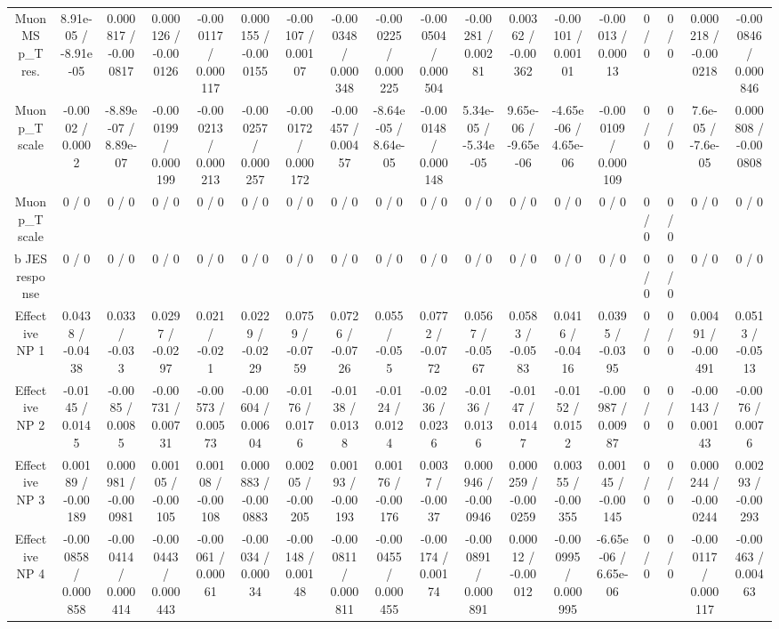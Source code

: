 \documentclass[10pt]{article}
\begin{document}
\begin{table}[htbp]
\begin{center}
\begin{tabular}{|c|c|c|c|c|c|c|c|c|c|c|c|c|c|c|c|c|c|}
  Muon MS p_{T} res. & 8.91e-05 / -8.91e-05 & 0.000817 / -0.000817 & 0.000126 / -0.000126 & -0.000117 / 0.000117 & 0.000155 / -0.000155 & -0.00107 / 0.00107 & -0.000348 / 0.000348 & -0.000225 / 0.000225 & -0.000504 / 0.000504 & -0.00281 / 0.00281 & 0.00362 / -0.00362 & -0.00101 / 0.00101 & -0.00013 / 0.00013 & 0 / 0 & 0 / 0 & 0.000218 / -0.000218 & -0.000846 / 0.000846 \\ 
  Muon p_{T} scale & -0.0002 / 0.0002 & -8.89e-07 / 8.89e-07 & -0.000199 / 0.000199 & -0.000213 / 0.000213 & -0.000257 / 0.000257 & -0.000172 / 0.000172 & -0.00457 / 0.00457 & -8.64e-05 / 8.64e-05 & -0.000148 / 0.000148 & 5.34e-05 / -5.34e-05 & 9.65e-06 / -9.65e-06 & -4.65e-06 / 4.65e-06 & -0.000109 / 0.000109 & 0 / 0 & 0 / 0 & 7.6e-05 / -7.6e-05 & 0.000808 / -0.000808 \\ 
  Muon p_{T} scale & 0 / 0 & 0 / 0 & 0 / 0 & 0 / 0 & 0 / 0 & 0 / 0 & 0 / 0 & 0 / 0 & 0 / 0 & 0 / 0 & 0 / 0 & 0 / 0 & 0 / 0 & 0 / 0 & 0 / 0 & 0 / 0 & 0 / 0 \\ 
  b JES response & 0 / 0 & 0 / 0 & 0 / 0 & 0 / 0 & 0 / 0 & 0 / 0 & 0 / 0 & 0 / 0 & 0 / 0 & 0 / 0 & 0 / 0 & 0 / 0 & 0 / 0 & 0 / 0 & 0 / 0 & 0 / 0 & 0 / 0 \\ 
  Effective NP 1 & 0.0438 / -0.0438 & 0.033 / -0.033 & 0.0297 / -0.0297 & 0.021 / -0.021 & 0.0229 / -0.0229 & 0.0759 / -0.0759 & 0.0726 / -0.0726 & 0.055 / -0.055 & 0.0772 / -0.0772 & 0.0567 / -0.0567 & 0.0583 / -0.0583 & 0.0416 / -0.0416 & 0.0395 / -0.0395 & 0 / 0 & 0 / 0 & 0.00491 / -0.00491 & 0.0513 / -0.0513 \\ 
  Effective NP 2 & -0.0145 / 0.0145 & -0.0085 / 0.0085 & -0.00731 / 0.00731 & -0.00573 / 0.00573 & -0.00604 / 0.00604 & -0.0176 / 0.0176 & -0.0138 / 0.0138 & -0.0124 / 0.0124 & -0.0236 / 0.0236 & -0.0136 / 0.0136 & -0.0147 / 0.0147 & -0.0152 / 0.0152 & -0.00987 / 0.00987 & 0 / 0 & 0 / 0 & -0.00143 / 0.00143 & -0.0076 / 0.0076 \\ 
  Effective NP 3 & 0.00189 / -0.00189 & 0.000981 / -0.000981 & 0.00105 / -0.00105 & 0.00108 / -0.00108 & 0.000883 / -0.000883 & 0.00205 / -0.00205 & 0.00193 / -0.00193 & 0.00176 / -0.00176 & 0.0037 / -0.0037 & 0.000946 / -0.000946 & 0.000259 / -0.000259 & 0.00355 / -0.00355 & 0.00145 / -0.00145 & 0 / 0 & 0 / 0 & 0.000244 / -0.000244 & 0.00293 / -0.00293 \\ 
  Effective NP 4 & -0.000858 / 0.000858 & -0.000414 / 0.000414 & -0.000443 / 0.000443 & -0.00061 / 0.00061 & -0.00034 / 0.00034 & -0.00148 / 0.00148 & -0.000811 / 0.000811 & -0.000455 / 0.000455 & -0.00174 / 0.00174 & -0.000891 / 0.000891 & 0.00012 / -0.00012 & -0.000995 / 0.000995 & -6.65e-06 / 6.65e-06 & 0 / 0 & 0 / 0 & -0.000117 / 0.000117 & -0.00463 / 0.00463 \\ 

\end{tabular}
\end{center}
\end{table}
\end{document}
